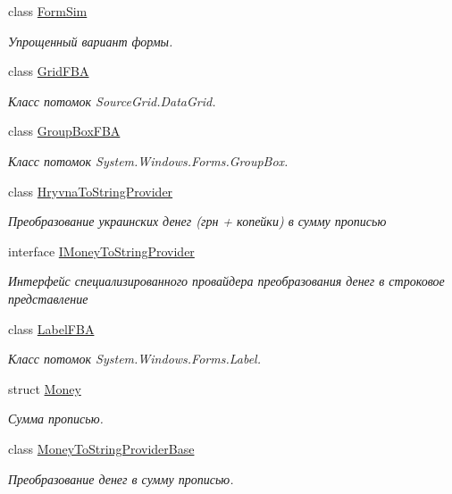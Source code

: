 \begin{DoxyCompactItemize}
class \mbox{\hyperlink{class_f_b_a_1_1_form_sim}{Form\+Sim}}
\begin{DoxyCompactList}\small\item\em Упрощенный вариант формы. \end{DoxyCompactList}\item 
class \mbox{\hyperlink{class_f_b_a_1_1_grid_f_b_a}{Grid\+F\+BA}}
\begin{DoxyCompactList}\small\item\em Класс потомок Source\+Grid.\+Data\+Grid. \end{DoxyCompactList}\item 
class \mbox{\hyperlink{class_f_b_a_1_1_group_box_f_b_a}{Group\+Box\+F\+BA}}
\begin{DoxyCompactList}\small\item\em Класс потомок System.\+Windows.\+Forms.\+Group\+Box. \end{DoxyCompactList}\item 
class \mbox{\hyperlink{class_f_b_a_1_1_hryvna_to_string_provider}{Hryvna\+To\+String\+Provider}}
\begin{DoxyCompactList}\small\item\em Преобразование украинских денег (грн + копейки) в сумму прописью \end{DoxyCompactList}\item 
interface \mbox{\hyperlink{interface_f_b_a_1_1_i_money_to_string_provider}{I\+Money\+To\+String\+Provider}}
\begin{DoxyCompactList}\small\item\em Интерфейс специализированного провайдера преобразования денег в строковое представление \end{DoxyCompactList}\item 
class \mbox{\hyperlink{class_f_b_a_1_1_label_f_b_a}{Label\+F\+BA}}
\begin{DoxyCompactList}\small\item\em Класс потомок System.\+Windows.\+Forms.\+Label. \end{DoxyCompactList}\item 
struct \mbox{\hyperlink{struct_f_b_a_1_1_money}{Money}}
\begin{DoxyCompactList}\small\item\em Сумма прописью. \end{DoxyCompactList}\item 
class \mbox{\hyperlink{class_f_b_a_1_1_money_to_string_provider_base}{Money\+To\+String\+Provider\+Base}}
\begin{DoxyCompactList}\small\item\em Преобразование денег в сумму прописью. \end{DoxyCompactList}\item 

\end{DoxyCompactItemize}
